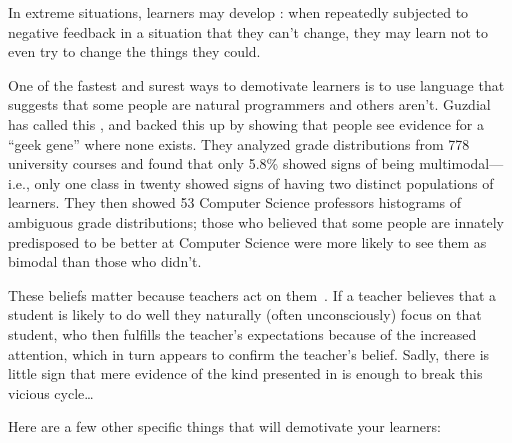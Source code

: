 In extreme situations,
learners may develop :
when repeatedly subjected to negative feedback in a situation that they can't change,
they may learn not to even try to change the things they could.

One of the fastest and surest ways to demotivate learners is
to use language that suggests that some people are natural programmers and others aren't.
Guzdial has called this
,
and \cite{Pati2016} backed this up by showing that people see evidence for a ``geek gene'' where none exists.
They analyzed grade distributions from 778 university courses and found that only 5.8\% showed signs of being multimodal---i.e.,
only one class in twenty showed signs of having two distinct populations of learners.
They then showed 53 Computer Science professors histograms of ambiguous grade distributions;
those who believed that some people are innately predisposed to be better at Computer Science
were more likely to see them as bimodal than those who didn't.

These beliefs matter because teachers act on them~\cite{Brop1983}.
If a teacher believes that a student is likely to do well
they naturally (often unconsciously) focus on that student,
who then fulfills the teacher's expectations because of the increased attention,
which in turn appears to confirm the teacher's belief.
Sadly,
there is little sign that mere evidence of the kind presented in \cite{Pati2016}
is enough to break this vicious cycle{\ldots}

Here are a few other specific things that will demotivate your learners:


